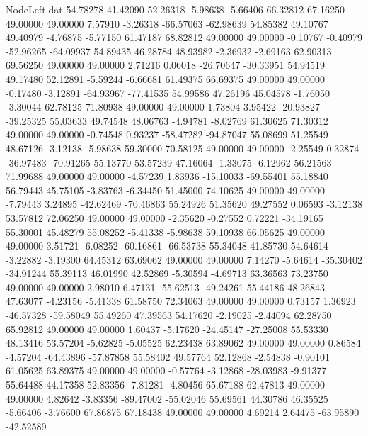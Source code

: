 \begin{filecontents}{NodeLeft.dat}
  54.78278   41.42090   52.26318    -5.98638   -5.66406   66.32812   67.16250   49.00000   49.00000    7.57910   -3.26318  -66.57063  -62.98639
  54.85382   49.10767   49.40979    -4.76875   -5.77150   61.47187   68.82812   49.00000   49.00000   -0.10767   -0.40979  -52.96265  -64.09937
  54.89435   46.28784   48.93982    -2.36932   -2.69163   62.90313   69.56250   49.00000   49.00000    2.71216    0.06018  -26.70647  -30.33951
  54.94519   49.17480   52.12891    -5.59244   -6.66681   61.49375   66.69375   49.00000   49.00000   -0.17480   -3.12891  -64.93967  -77.41535
  54.99586   47.26196   45.04578    -1.76050   -3.30044   62.78125   71.80938   49.00000   49.00000    1.73804    3.95422  -20.93827  -39.25325
  55.03633   49.74548   48.06763    -4.94781   -8.02769   61.30625   71.30312   49.00000   49.00000   -0.74548    0.93237  -58.47282  -94.87047
  55.08699   51.25549   48.67126    -3.12138   -5.98638   59.30000   70.58125   49.00000   49.00000   -2.25549    0.32874  -36.97483  -70.91265
  55.13770   53.57239   47.16064    -1.33075   -6.12962   56.21563   71.99688   49.00000   49.00000   -4.57239    1.83936  -15.10033  -69.55401
  55.18840   56.79443   45.75105    -3.83763   -6.34450   51.45000   74.10625   49.00000   49.00000   -7.79443    3.24895  -42.62469  -70.46863
  55.24926   51.35620   49.27552     0.06593   -3.12138   53.57812   72.06250   49.00000   49.00000   -2.35620   -0.27552    0.72221  -34.19165
  55.30001   45.48279   55.08252    -5.41338   -5.98638   59.10938   66.05625   49.00000   49.00000    3.51721   -6.08252  -60.16861  -66.53738
  55.34048   41.85730   54.64614    -3.22882   -3.19300   64.45312   63.69062   49.00000   49.00000    7.14270   -5.64614  -35.30402  -34.91244
  55.39113   46.01990   42.52869    -5.30594   -4.69713   63.36563   73.23750   49.00000   49.00000    2.98010    6.47131  -55.62513  -49.24261
  55.44186   48.26843   47.63077    -4.23156   -5.41338   61.58750   72.34063   49.00000   49.00000    0.73157    1.36923  -46.57328  -59.58049
  55.49260   47.39563   54.17620    -2.19025   -2.44094   62.28750   65.92812   49.00000   49.00000    1.60437   -5.17620  -24.45147  -27.25008
  55.53330   48.13416   53.57204    -5.62825   -5.05525   62.23438   63.89062   49.00000   49.00000    0.86584   -4.57204  -64.43896  -57.87858
  55.58402   49.57764   52.12868    -2.54838   -0.90101   61.05625   63.89375   49.00000   49.00000   -0.57764   -3.12868  -28.03983   -9.91377
  55.64488   44.17358   52.83356    -7.81281   -4.80456   65.67188   62.47813   49.00000   49.00000    4.82642   -3.83356  -89.47002  -55.02046
  55.69561   44.30786   46.35525    -5.66406   -3.76600   67.86875   67.18438   49.00000   49.00000    4.69214    2.64475  -63.95890  -42.52589

\end{filecontents}
